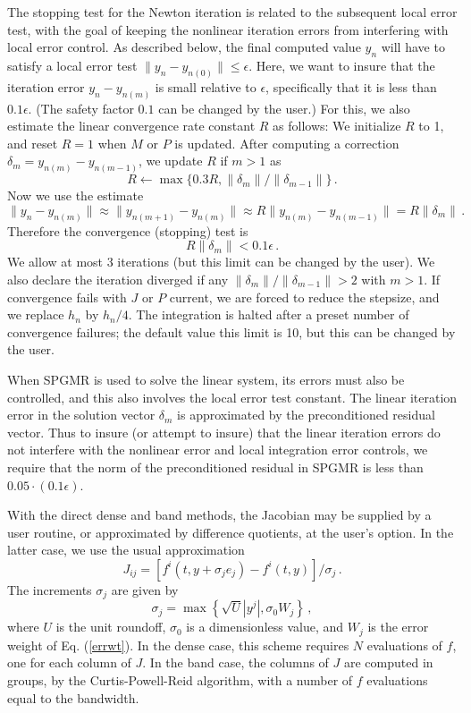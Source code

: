 The stopping test for the Newton iteration is related to the
subsequent local error test, with the goal of keeping the nonlinear
iteration errors from interfering with local error control.  As
described below, the final computed value $y_n$ will have to satisfy a
local error test $\| y_n - y_{n(0)} \| \leq \epsilon$.  Here, we want
to insure that the iteration error $y_n - y_{n(m)}$ is small relative
to $\epsilon$, specifically that it is less than $0.1 \epsilon$.
(The safety factor $0.1$ can be changed by the user.)  For this, we
also estimate the linear convergence rate constant $R$ as follows:
We initialize $R$ to 1, and reset $R = 1$ when $M$ or $P$ is updated.
After computing a correction $\delta_m = y_{n(m)}-y_{n(m-1)}$, we
update $R$ if $m > 1$ as
\begin{equation*}
  R \leftarrow \max\{0.3R , \|\delta_m\| / \|\delta_{m-1}\| \} \, . 
\end{equation*}
Now we use the estimate
\begin{equation*}
  \| y_n - y_{n(m)} \| \approx \| y_{n(m+1)} - y_{n(m)} \| 
  \approx R \| y_{n(m)} - y_{n(m-1)} \|  =  R \|\delta_m \| \, . 
\end{equation*}
Therefore the convergence (stopping) test is 
\begin{equation*}
  R \|\delta_m \| < 0.1 \epsilon \, .
\end{equation*}
We allow at most 3 iterations (but this limit can be changed by the
user).  We also declare the iteration diverged if any $\|\delta_m\| /
\|\delta_{m-1}\| > 2$ with $m > 1$. If convergence fails with $J$ or
$P$ current, we are forced to reduce the stepsize, and we replace
$h_n$ by $h_n/4$.  The integration is halted after a preset number
of convergence failures; the default value this limit is 10, 
but this can be changed by the user.

When SPGMR is used to solve the linear system, its errors must also be
controlled, and this also involves the local error test constant.  The
linear iteration error in the solution vector $\delta_m$ is
approximated by the preconditioned residual vector.  Thus to insure
(or attempt to insure) that the linear iteration errors do not
interfere with the nonlinear error and local integration error
controls, we require that the norm of the preconditioned residual
in SPGMR is less than $0.05 \cdot (0.1 \epsilon)$.

With the direct dense and band methods, the Jacobian may be supplied
by a user routine, or approximated by difference quotients,
at the user's option.  In the latter case, we use the usual
approximation
\[ J_{ij} = [f^i(t,y+\sigma_j e_j) - f^i(t,y)]/\sigma_j \, . \]
The increments $\sigma_j$ are given by
\[ \sigma_j = \max\left\{\sqrt{U} |y^j| , \sigma_0 W_j \right\} \, , \]
where $U$ is the unit roundoff, $\sigma_0$ is a dimensionless value,
and $W_j$ is the error weight of Eq. (\ref{errwt}).  In the dense
case, this scheme requires $N$ evaluations of $f$, one for each column
of $J$.  In the band case, the columns of $J$ are computed in groups,
by the Curtis-Powell-Reid algorithm, with a number of $f$ evaluations
equal to the bandwidth.

